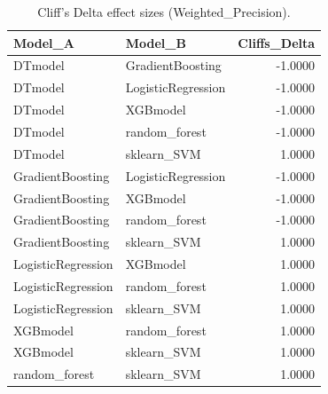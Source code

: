 \begin{table}[t]
\centering
\begin{tabular}{llr}
\toprule
Model_A & Model_B & Cliffs_Delta \\
\midrule
DTmodel & GradientBoosting & -1.0000 \\
DTmodel & LogisticRegression & -1.0000 \\
DTmodel & XGBmodel & -1.0000 \\
DTmodel & random_forest & -1.0000 \\
DTmodel & sklearn_SVM & 1.0000 \\
GradientBoosting & LogisticRegression & -1.0000 \\
GradientBoosting & XGBmodel & -1.0000 \\
GradientBoosting & random_forest & -1.0000 \\
GradientBoosting & sklearn_SVM & 1.0000 \\
LogisticRegression & XGBmodel & 1.0000 \\
LogisticRegression & random_forest & 1.0000 \\
LogisticRegression & sklearn_SVM & 1.0000 \\
XGBmodel & random_forest & 1.0000 \\
XGBmodel & sklearn_SVM & 1.0000 \\
random_forest & sklearn_SVM & 1.0000 \\
\bottomrule
\end{tabular}
\caption{Cliff's Delta effect sizes (Weighted_Precision).}
\label{tab:cliffs_Weighted_Precision}
\end{table}